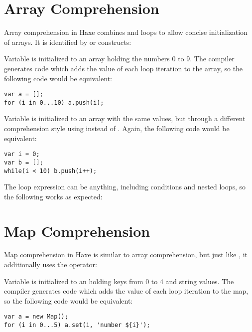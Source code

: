 \section{Array Comprehension}
\label{lf-array-comprehension}

Array comprehension in Haxe combines  and loops to allow concise initialization of arrays. It is identified by  or  constructs:


Variable  is initialized to an array holding the numbers 0 to 9. The compiler generates code which adds the value of each loop iteration to the array, so the following code would be equivalent:

\begin{lstlisting}
var a = [];
for (i in 0...10) a.push(i);
\end{lstlisting}

Variable  is initialized to an array with the same values, but through a different comprehension style using  instead of . Again, the following code would be equivalent:

\begin{lstlisting}
var i = 0;
var b = [];
while(i < 10) b.push(i++);
\end{lstlisting}

The loop expression can be anything, including conditions and nested loops, so the following works as expected:


\section{Map Comprehension}
\label{lf-map-comprehension}

Map comprehension in Haxe is similar to array comprehension, but just like , it additionally uses the \ic{=>} operator:


Variable  is initialized to an  holding keys from 0 to 4 and string values. The compiler generates code which adds the value of each loop iteration to the map, so the following code would be equivalent:

\begin{lstlisting}
var a = new Map();
for (i in 0...5) a.set(i, 'number ${i}');
\end{lstlisting}

